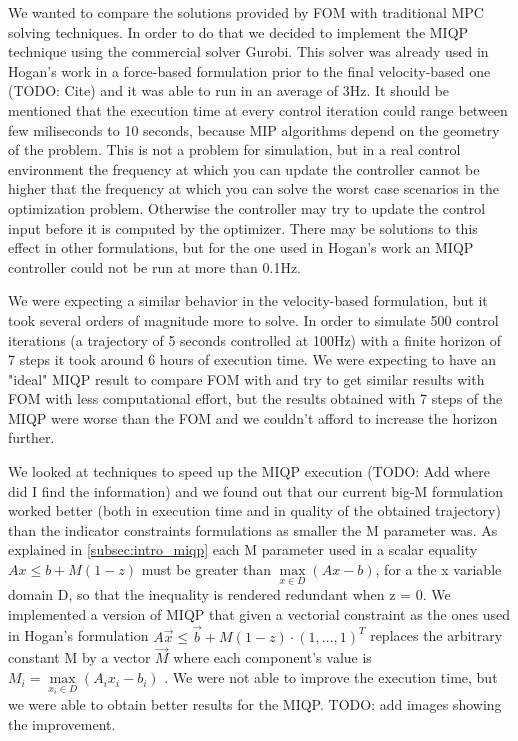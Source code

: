 \documentclass[12,twoside]{TFG-GM}
\theoremstyle{definition}
\theoremstyle{remark}
\begin{document}
We wanted to compare the solutions provided by FOM with traditional MPC solving techniques. In order to do that we decided to implement the MIQP technique using the commercial solver Gurobi. This solver was already used in Hogan's work in a force-based formulation prior to the final velocity-based one (TODO: Cite) and it was able to run in an average of 3Hz. It should be mentioned that the execution time at every control iteration could range between few miliseconds to 10 seconds, because MIP algorithms depend on the geometry of the problem.
This is not a problem for simulation, but in a real control environment the frequency at which you can update the controller cannot be higher that the frequency at which you can solve the worst case scenarios in the optimization problem. Otherwise the controller may try to update the control input before it is computed by the optimizer. There may be solutions to this effect in other formulations, but for the one used in Hogan's work an MIQP controller could not be run at more than 0.1Hz.

We were expecting a similar behavior in the velocity-based formulation, but it took several orders of magnitude more to solve. In order to simulate 500 control iterations (a trajectory of 5 seconds controlled at 100Hz) with a finite horizon of 7 steps it took around 6 hours of execution time. We were expecting to have an "ideal" MIQP result to compare FOM with and try to get similar results with FOM with less computational effort, but the results obtained with 7 steps of the MIQP were worse than the FOM and we couldn't afford to increase the horizon further.

We looked at techniques to speed up the MIQP execution (TODO: Add where did I find the information) and we found out that our current big-M formulation worked better (both in execution time and in quality of the obtained trajectory) than the indicator constraints formulations as smaller the M parameter was. As explained in \ref{subsec:intro_miqp} each M parameter used in a scalar equality $Ax \leq b + M (1 - z)$ must be greater than $\max\limits_{x \in D}{(Ax - b)}$, for a the x variable domain D, so that the inequality is rendered redundant when z = 0. We implemented a version of MIQP that given a vectorial constraint as the ones used in Hogan's formulation $A\vec{x} \leq \vec{b} + M (1 - z) \cdot (1, ..., 1)^T$ replaces the arbitrary constant M by a vector $\vec{M}$ where each component's value is $M_i = \max\limits_{x_i \in D}{(A_i x_i - b_i)}$
. We were not able to improve the execution time, but we were able to obtain better results for the MIQP. TODO: add images showing the improvement.
\end{document}
